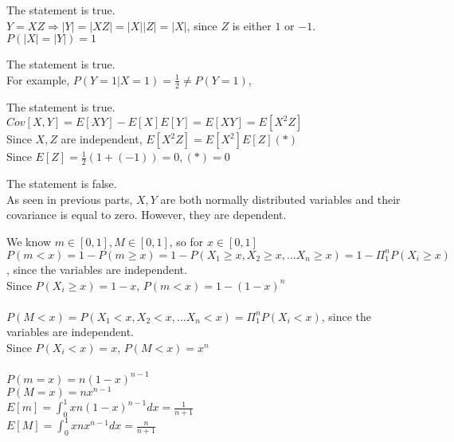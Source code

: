 \documentclass[12pt]{article}
\newenvironment{problem}[2][Problem]{\begin{trivlist}
\item[\hskip \labelsep {\bfseries #1}\hskip \labelsep {\bfseries #2.}]}{\end{trivlist}}
\begin{document}
\begin{problem}{7(b)}\hfill\linebreak
The statement is true.\\
$Y=XZ\Rightarrow |Y|=|XZ|=|X||Z|=|X|$, since $Z$ is either $1$ or $-1$.\\
$P(|X|=|Y|)=1$
\end{problem}

\begin{problem}{7(c)}\hfill\linebreak
The statement is true.\\
For example, $P(Y=1|X=1)=\frac{1}{2}\neq P(Y=1)$,
\end{problem}

\begin{problem}{7(d)}\hfill\linebreak
The statement is true.\\
$Cov[X,Y]=E[XY]-E[X]E[Y]=E[XY]=E[X^2Z]$\\
Since $X,Z$ are independent, $E[X^2Z]=E[X^2]E[Z] (*)$\\
Since $E[Z]=\frac{1}{2}(1+(-1))=0, (*)=0$
\end{problem}

\begin{problem}{7(e)}\hfill\linebreak
The statement is false. \\
As seen in previous parts, $X,Y$ are both normally distributed variables and their covariance is equal to zero. However, they are dependent.
\end{problem}

\begin{problem}{8}\hfill\linebreak
We know $m\in [0,1], M\in [0,1]$, so for $x\in [0,1]$
$P(m<x)=1-P(m\geq x)=1-P(X_1\geq x,X_2\geq x,...X_n\geq x)=1-\Pi_1^nP(X_i\geq x)$, since the variables are independent.\\
Since $P(X_i\geq x)=1-x$, $P(m<x)=1-(1-x)^n$\\
\\
$P(M<x)=P(X_1<x,X_2<x,...X_n<x)=\Pi_1^nP(X_i<x)$, since the variables are independent.\\
Since $P(X_i<x)=x$, $P(M<x)=x^n$\\
\\
$P(m=x)=n(1-x)^{n-1}$\\
$P(M=x)=nx^{n-1}$\\
$E[m]=\int_0^1 xn(1-x)^{n-1}dx=\frac{1}{n+1}$\\
$E[M]=\int_0^1 xnx^{n-1}dx=\frac{n}{n+1}$
\end{problem}
\end{document}
